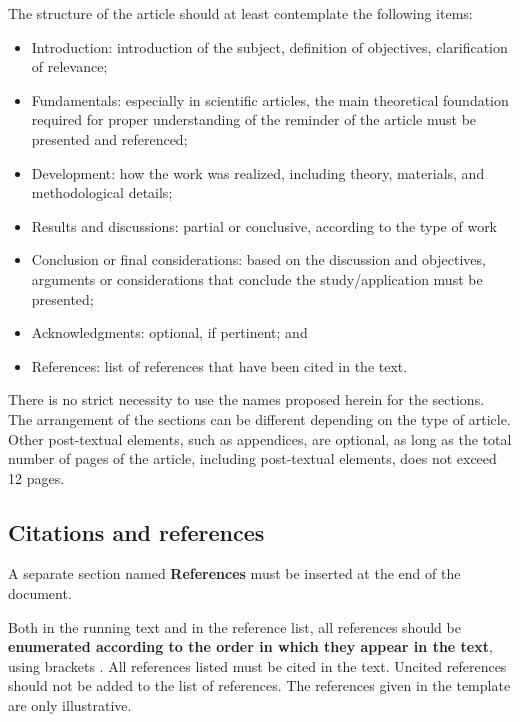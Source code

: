 \documentclass[12pt, a4paper, twoside, twocolumn]{article}
\begin{document}
The structure of the article should at least contemplate the following items:
%
\begin{itemize}[noitemsep,topsep=1ex] \itemsep=6pt
    \item Introduction: introduction of the subject, definition of objectives, clarification of relevance;
    \item Fundamentals: especially in scientific articles, the main theoretical foundation required for proper understanding of the reminder of the article must be presented and referenced;
    \item Development: how the work was realized, including theory, materials, and methodological details;
    \item Results and discussions: partial or conclusive, according to the type of work
    \item Conclusion or final considerations: based on the discussion and objectives, arguments or considerations that conclude the study/application must be presented;
    \item Acknowledgments: optional, if pertinent; and
    \item References: list of references that have been cited in the text.
\end{itemize}
%
There is no strict necessity to use the names proposed herein for the sections. The arrangement of the sections can be different depending on the type of article. Other post-textual elements, such as appendices, are optional, as long as the total number of pages of the article, including post-textual elements, does not exceed 12 pages.

\subsection{Citations and references}

A separate section named \textbf{References}  must be inserted at the end of the document.

Both in the running text and in the reference list, all references should be \textbf{enumerated according to the order in which they appear in the text}, using brackets \cite{Gomes-2015}. All references listed must be cited in the text. Uncited references should not be added to the list of references. The references given in the template \cite{Mareze-2017,Fonseca-2013,Brandao-2017,Gomes-2015,Oppenheim-1996,Muller-2001,Mareze-2019,Borges-2018,Ristow-2016} are only illustrative.
\end{document}

